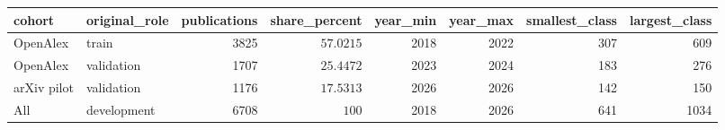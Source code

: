 \begin{tabular}{llrrrrrr}
\toprule
cohort & original\_role & publications & share\_percent & year\_min & year\_max & smallest\_class & largest\_class \\
\midrule
OpenAlex & train & 3825 & $57.0215$ & 2018 & 2022 & 307 & 609 \\
OpenAlex & validation & 1707 & $25.4472$ & 2023 & 2024 & 183 & 276 \\
arXiv pilot & validation & 1176 & $17.5313$ & 2026 & 2026 & 142 & 150 \\
All & development & 6708 & $100$ & 2018 & 2026 & 641 & 1034 \\
\bottomrule
\end{tabular}
